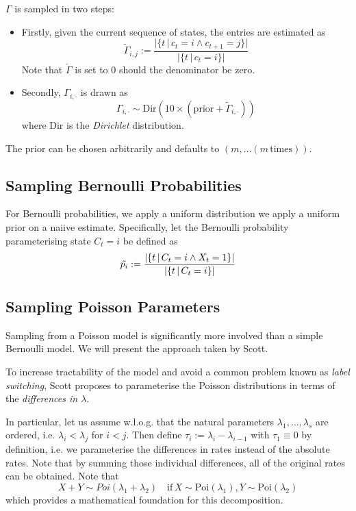  


 	$\Gamma$ is sampled in two steps:
 	\begin{itemize}
 		\item Firstly, given the current sequence of states, the entries are estimated as 
 			\[
 				\tilde{\Gamma}_{i, j} := \frac{ 
 					\Bigg| \Big\{ t \, | \, c_t = i \land c_{t+1} = j \Big\}\Bigg|	
 				 }{
 			 			\Bigg| \Big\{ t \, | \, c_t = i \Big\}\Bigg|	
 		 		}
 			\]
 			Note that $\tilde{\Gamma}$  is set to $0$ should the denominator be zero. 
 		\item Secondly, $\Gamma_{i, \cdot}$ is drawn as 
 			\[
 				\Gamma_{i, \cdot} \sim  \text{Dir}(10 \times (\text{prior} + \tilde{\Gamma}_{i, \cdot }))
 			\]
 			where Dir is the \textit{Dirichlet} distribution. 
 	\end{itemize}
 
 	The prior can be chosen arbitrarily and defaults to  $\left(m, \dots (m \, \text{times})\right)$.
 	
 	
 	\subsection{Sampling Bernoulli Probabilities}
 		For Bernoulli probabilities, we apply a uniform distribution we apply a uniform prior on a naiive estimate. 
 		Specifically, let the Bernoulli probability parameterising state $C_t = i$ be defined as  
 		\[
 			\tilde{p_i} := \frac{\left| \left\{ t \, | \, C_t = i \land X_t = 1 \right\} \right|}{\left| \left\{ t \, | \, C_t = i \right\} \right|}
 		\]
 		
 		
 	\subsection{Sampling Poisson Parameters}
		Sampling from a Poisson model is significantly more involved  than a simple Bernoulli model. We will present the approach taken by Scott\cite{scott}. 
		
		To increase tractability of the model and avoid a common problem known as \textit{label switching}, Scott proposes to parameterise the Poisson distributions in terms of the \textit{differences in $\lambda$}. 
		
		In particular, let us assume w.l.o.g. that the natural parameters $\lambda_1, \dots, \lambda_s$ are ordered, i.e. $\lambda_i < \lambda_j $ for $ i < j$. Then define $\tau_i := \lambda_i - \lambda_{i-1}$ with $\tau_1 \equiv 0$ by definition, i.e. we parameterise the differences in rates instead of the absolute rates.  Note that by summing those individual differences, all of the original rates can be obtained. Note that 
		\[
		X + Y \sim Poi(\lambda_1 + \lambda_2) \quad \text{if} \, X \sim \text{Poi}(\lambda_1), Y \sim \text{Poi}(\lambda_2)
		\]
		which provides a mathematical foundation for this decomposition. 
		
